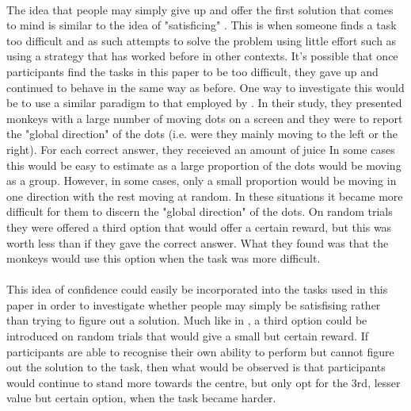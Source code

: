 \documentclass[12pt]{article}
\begin{document}
\paragraph{} The idea that people may simply give up and offer the first solution that comes to mind is similar to the idea of "satisficing" \citep{simon1990invariants}. This is when someone finds a task too difficult and as such attempts to solve the problem using little effort such as using a strategy that has worked before in other contexts. It's possible that once participants find the tasks in this paper to be too difficult, they gave up and continued to behave in the same way as before. One way to investigate this would be to use a similar paradigm to that employed by \cite{Kiani759}. In their study, they presented monkeys with a large number of moving dots on a screen and they were to report the "global direction" of the dots (i.e. were they mainly moving to the left or the right). For each correct answer, they receieved an amount of juice In some cases this would be easy to estimate as a large proportion of the dots would be moving as a group. However, in some cases, only a small proportion would be moving in one direction with the rest moving at random. In these situations it became more difficult for them to discern the "global direction" of the dots. On random trials they were offered a third option that would offer a certain reward, but this was worth less than if they gave the correct answer. What they found was that the monkeys would use this option when the task was more difficult. 

\paragraph{} This idea of confidence could easily be incorporated into the tasks used in this paper in order to investigate whether people may simply be satisfising rather than trying to figure out a solution. Much like in \cite{Kiani759}, a third option could be introduced on random trials that would give a small but certain reward. If participants are able to recognise their own ability to perform but cannot figure out the solution to the task, then what would be observed is that participants would continue to stand more towards the centre, but only opt for the 3rd, lesser value but certain option, when the task became harder. 
\end{document}
